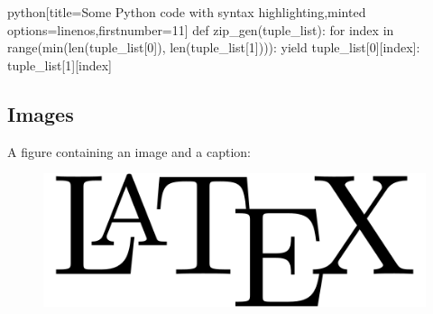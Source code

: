 \begin{code}{python}[title={Some Python code with syntax highlighting},minted options={linenos,firstnumber=11}]
def zip_gen(tuple_list):
    for index in range(min(len(tuple_list[0]), len(tuple_list[1]))):
        yield {tuple_list[0][index]: tuple_list[1][index]}
\end{code}

\subsection{Images}

A figure containing an image and a caption:
\begin{figure}[H]
    \includegraphics[width=0.8\linewidth]{LaTeX-logo.png}
\end{figure}
